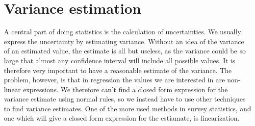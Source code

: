 \documentclass{article}
\begin{document}
\section{Variance estimation}

A central part of doing statistics is the calculation of uncertainties. We
usually express the uncertainty by estimating variance. Without an idea of the
variance of an estimated value, the estimate is all but useless, as the variance
could be so large that almost any confidence interval will include all possible
values. It is therefore very important to have a reasonable estimate of the
variance. The problem, however, is that in regression the values we are
interested in are non-linear expressions. We therefore can't find a closed form
expression for the variance estimate using normal rules, so we instead have to
use other techniques to
find variance estimates. One of the more used methods in survey
statistics, and one which will give a closed form expression for the estiamate,
is linearization.
\end{document}
